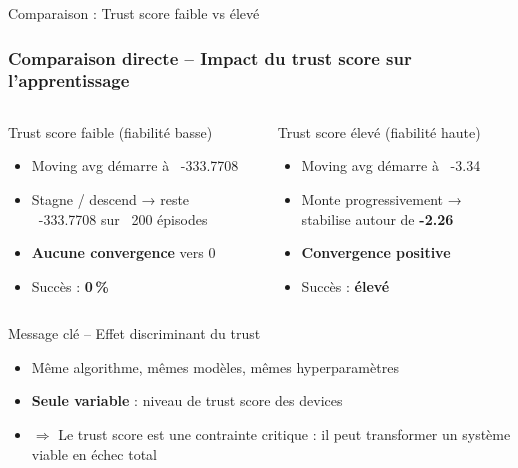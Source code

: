 \documentclass[aspectratio=169]{beamer}
\begin{document}
\begin{frame}{Comparaison : Trust score faible vs élevé}
\frametitle{Comparaison directe – Impact du trust score sur l'apprentissage}

\begin{columns}[T]
    \begin{alertblock}{Trust score faible (fiabilité basse)}
    \small
    \begin{itemize}
        \item Moving avg démarre à ~-333.7708
        \item Stagne / descend → reste ~-333.7708 sur ~200 épisodes
        \item \textbf{Aucune convergence} vers 0
        \item Succès : \textbf{0\,\%}
    \end{itemize}
    \end{alertblock}

    \begin{exampleblock}{Trust score élevé (fiabilité haute)}
    \small
    \begin{itemize}
        \item Moving avg démarre à ~-3.34
        \item Monte progressivement → stabilise autour de \textbf{-2.26}
        \item \textbf{Convergence positive}
        \item Succès : \textbf{élevé}
    \end{itemize}
    \end{exampleblock}
\end{columns}

\begin{alertblock}{Message clé – Effet discriminant du trust}
\begin{itemize}
    \item Même algorithme, mêmes modèles, mêmes hyperparamètres
    \item \textbf{Seule variable} : niveau de trust score des devices
    \item $\Rightarrow$ \alert{Le trust score est une contrainte critique : il peut transformer un système viable en échec total}
\end{itemize}
\end{alertblock}
\end{frame}


\end{document}
